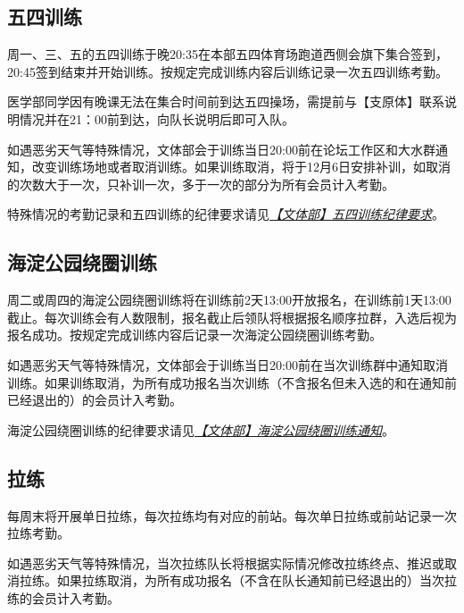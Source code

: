 \documentclass[UTF8]{ctexart}
\begin{document}
\begin{table}[h]
{\begin{tabular}
    \end{tabular}%
    }
\end{table}

\subsection{五四训练}

周一、三、五的五四训练于晚20:35在本部五四体育场跑道西侧会旗下集合签到，20:45签到结束并开始训练。按规定完成训练内容后训练记录一次五四训练考勤。

医学部同学因有晚课无法在集合时间前到达五四操场，需提前与【支原体】联系说明情况并在21：00前到达，向队长说明后即可入队。

如遇恶劣天气等特殊情况，文体部会于训练当日20:00前在论坛工作区和大水群通知，改变训练场地或者取消训练。如果训练取消，将于12月6日安排补训，如取消的次数大于一次，只补训一次，多于一次的部分为所有会员计入考勤。

特殊情况的考勤记录和五四训练的纪律要求请见\href{https://chexie.net/bbs/content/index.php?bid=1\&tid=9576\&p=1}{\textit{【文体部】五四训练纪律要求}}。


\subsection{海淀公园绕圈训练}

周二或周四的海淀公园绕圈训练将在训练前2天13:00开放报名，在训练前1天13:00截止。每次训练会有人数限制，报名截止后领队将根据报名顺序拉群，入选后视为报名成功。按规定完成训练内容后记录一次海淀公园绕圈训练考勤。

如遇恶劣天气等特殊情况，文体部会于训练当日20:00前在当次训练群中通知取消训练。如果训练取消，为所有成功报名当次训练（不含报名但未入选的和在通知前已经退出的）的会员计入考勤。

海淀公园绕圈训练的纪律要求请见\href{https://chexie.net/bbs/content/?bid=1&tid=9615&p=1}{\textit{【文体部】海淀公园绕圈训练通知}}。

\subsection{拉练}

每周末将开展单日拉练，每次拉练均有对应的前站。每次单日拉练或前站记录一次拉练考勤。

如遇恶劣天气等特殊情况，当次拉练队长将根据实际情况修改拉练终点、推迟或取消拉练。如果拉练取消，为所有成功报名（不含在队长通知前已经退出的）当次拉练的会员计入考勤。
\end{document}
